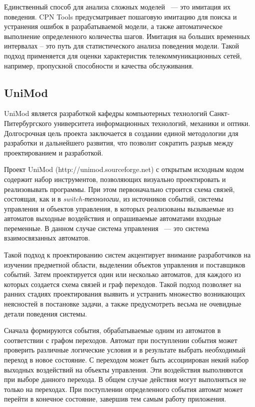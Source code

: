 Единственный способ для анализа сложных моделей ~--- это имитация их поведения. CPN Tools предусматривает пошаговую имитацию для поиска и устранения ошибок в разрабатываемой модели, а также автоматическое выполнение определенного количества шагов. Имитация на больших временных интервалах – это путь для статистического анализа поведения модели. Такой подход применяется для оценки характеристик телекоммуникационных сетей, например, пропускной способности и качества обслуживания.

\subsection{UniMod}

UniMod является разработкой кафедры компьютерных технологий Санкт-Питербургского университета информационных технологий, механики и оптики. Долгосрочная цель проекта заключается в создании единой методологии для разработки и дальнейшего развития, что позволит сократить разрыв между проектированием и разработкой.

Проект UniMod (http://unimod.sourceforge.net) с открытым исходным кодом содержит набор инструментов, позволяющих визуально проектировать и реализовывать программы. При этом первоначально строится схема связей, состоящая, как и в \textit{switch-технологии}, из источников событий, системы управления и объектов управления, в которых реализованы вызываемые из автоматов выходные воздействия и опрашиваемые автоматами входные переменные. В данном случае система управления ~--- это система взаимосвязанных автоматов.

Такой подход к проектированию систем акцентирует внимание разработчиков на изучении предметной области, выделении объектов управления и поставщиков событий. Затем проектируется один или несколько автоматов, для каждого из которых создается схема связей и граф переходов. Такой подход позволяет на ранних стадиях проектирования выявить и устранить множество возникающих неясностей в постановке задачи, а также предусмотреть весьма не очевидные детали поведения системы.

Сначала формируются события, обрабатываемые одним из автоматов в соответствии с графом переходов. Автомат при поступлении события может проверить различные логические условия и в результате выбрать необходимый переход в новое состояние. С переходом может быть ассоциирован некий набор выходных воздействий на объекты управления. Эти воздействия выполняются при выборе данного перехода. В общем случае действия могут выполняться не только на переходах. При поступлении определенного события автомат может перейти в конечное состояние, завершив тем самым работу приложения.

